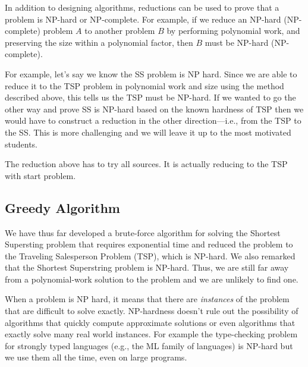 \begin{cluster}
\label{grp:rmrk:genome::hardness-of-shortest-superstring}

\begin{remark}
\label{rmrk:genome::hardness-of-shortest-superstring}
In addition to designing algorithms, reductions can be used to prove
that a problem is NP-hard or NP-complete.  For example, if we reduce
an NP-hard (NP-complete) problem $A$ to another problem $B$ by
performing polynomial work, and preserving the size within a
polynomial factor, then $B$ must be NP-hard (NP-complete).

For example, let's say we know the SS problem is NP hard.   Since we are
able to reduce it to the TSP problem in polynomial work and size using the
method described above, this tells us the TSP must be NP-hard.     If
we wanted to go the other way and prove SS is NP-hard based on the
known hardness of TSP then we would have to construct a reduction in the
other direction---i.e., from the TSP to the SS.      This is more
challenging and we will leave it up to the most motivated students.

\end{remark}
\end{cluster}

\begin{cluster}
\label{grp:tch:genome::reduction}

\begin{teachnote}
\label{tch:genome::reduction}
The reduction above has to try all sources.  It is actually reducing
to the TSP with start problem.

\end{teachnote}
\end{cluster}


\subsection{Greedy Algorithm}
\label{sec:genome::alg::greedy}

\begin{cluster}
\label{grp:grm:genome::developed}

\begin{gram}
\label{grm:genome::developed}
We have thus far developed a brute-force algorithm for solving the
Shortest Supersting problem that requires exponential time and reduced
the problem to the Traveling Salesperson Problem (TSP), which is
NP-hard.
We also remarked that the Shortest Superstring problem is NP-hard.
Thus, we are still far away from a polynomial-work solution to the
problem and we are unlikely to find one.

When a problem is NP hard, it means that there are {\em instances} of
the problem that are difficult to solve exactly.  
NP-hardness doesn't rule out the possibility of algorithms that
quickly compute approximate solutions or even algorithms
that exactly solve many real world instances.
For example the type-checking problem for strongly typed languages
(e.g., the ML family of languages) is NP-hard but we use them all the
time, even on large programs.

\end{gram}
\end{cluster}

